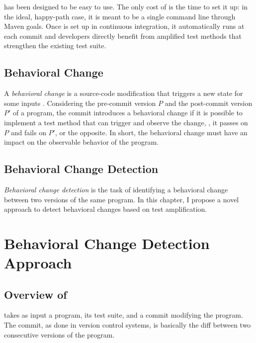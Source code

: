 \DCI has been designed to be easy to use.
The only cost of \DCI is the time to set it up: in the ideal, happy-path case, it is meant to be a single command line through Maven goals.
Once \DCI is set up in continuous integration, it automatically runs at each commit and developers directly benefit from amplified test methods that strengthen the existing test suite.

%
%
\subsection{Behavioral Change}
\label{subsec:dci:background:behavioral-change}

A \emph{behavioral change} is a source-code modification that triggers a new state for some inputs \cite{saff2004experimental}.
Considering the pre-commit version $P$ and the post-commit version $P'$ of a program, the commit introduces a behavioral change if it is possible to implement a test method that can trigger and observe the change, \ie, it passes on $P$ and fails on $P'$, or the opposite.
In short, the behavioral change must have an impact on the observable behavior of the program.

%
%
\subsection{Behavioral Change Detection}
\label{subsec:dci:background:behavioral-change-detection}

\emph{Behavioral change detection} is the task of identifying a behavioral change between two versions of the same program.
In this chapter, I propose a novel approach to detect behavioral changes based on test amplification.


\section{Behavioral Change Detection Approach}
\label{sec:dci:techniques}

\subsection{Overview of \DCI}
\label{sec:dci:techniques:overview}

\DCI takes as input a program, its test suite, and a commit modifying the program.
The commit, as done in version control systems, is basically the diff between two consecutive versions of the program.

